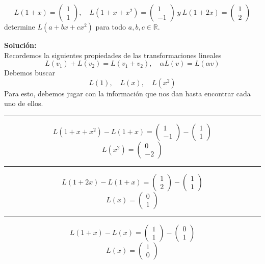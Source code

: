 \documentclass[12pt]{article}
\newenvironment{solucion}
{\begin{mdframed}[backgroundcolor=black!10]
		{\bf Solución:}\\
	}
	{
	\end{mdframed}
}
\newenvironment{preguntas}
{\begin{enumerate}\itemsep12pt
	}
	{
	\end{enumerate}
}
\newcommand{\R}{\mathbb{R}}
\begin{document}
\begin{preguntas}
	$$L(1+x) = \begin{pmatrix}
	1\\
	1
	\end{pmatrix}, \quad L(1+x+x^2) = \begin{pmatrix}
	1\\
	-1
	\end{pmatrix}\ y \ L(1+2x) = \begin{pmatrix}
	1\\
	2
	\end{pmatrix}$$
	determine $L(a+bx+cx^2)$ para todo $a,b,c \in \R$.
\begin{solucion}
Recordemos la siguientes propiedades de las transformaciones lineales
		$$L(v_1) + L(v_2) = L(v_1 + v_2), \quad \alpha L(v) = L(\alpha v)$$
		Debemos buscar 
		$$L(1), \quad L(x), \quad L(x^2)$$
		Para esto, debemos jugar con la información que nos dan hasta encontrar cada uno de ellos.
		\begin{center}\rule{14.5cm}{0.1pt}\end{center}
		$$L(1+x+x^2) - L(1+x) = \begin{pmatrix}
		1\\-1
		\end{pmatrix} - \begin{pmatrix}
		1\\1
		\end{pmatrix}$$
		$$L(x^2) = \begin{pmatrix}
		0\\-2
		\end{pmatrix}$$
		
		\begin{center}\rule{14.5cm}{0.1pt}\end{center}
		$$L(1+2x) - L(1+x) = \begin{pmatrix}
		1\\2
		\end{pmatrix} - \begin{pmatrix}
		1\\1
		\end{pmatrix}$$
		$$L(x) = \begin{pmatrix}
		0\\1
		\end{pmatrix}$$
		
		\begin{center}\rule{14.5cm}{0.1pt}\end{center}
		$$L(1+x) - L(x) = \begin{pmatrix}
		1\\1
		\end{pmatrix} - \begin{pmatrix}
		0\\1
		\end{pmatrix}$$
		$$L(x) = \begin{pmatrix}
		1\\0
		\end{pmatrix}$$
		

\end{solucion}
\end{preguntas}
\end{document}
